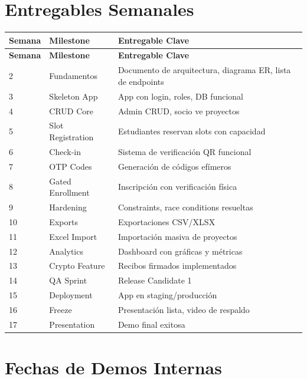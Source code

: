 \documentclass[12pt,a4paper]{article}
\begin{document}
\section{Entregables Semanales}

\begin{longtable}{@{}llp{8cm}@{}}
\toprule
\textbf{Semana} & \textbf{Milestone} & \textbf{Entregable Clave} \\
\midrule
\endfirsthead
\toprule
\textbf{Semana} & \textbf{Milestone} & \textbf{Entregable Clave} \\
\midrule
\endhead
2 & Fundamentos & Documento de arquitectura, diagrama ER, lista de endpoints \\
3 & Skeleton App & App con login, roles, DB funcional \\
4 & CRUD Core & Admin CRUD, socio ve proyectos \\
5 & Slot Registration & Estudiantes reservan slots con capacidad \\
6 & Check-in & Sistema de verificación QR funcional \\
7 & OTP Codes & Generación de códigos efímeros \\
8 & Gated Enrollment & Inscripción con verificación física \\
9 & Hardening & Constraints, race conditions resueltas \\
10 & Exports & Exportaciones CSV/XLSX \\
11 & Excel Import & Importación masiva de proyectos \\
12 & Analytics & Dashboard con gráficas y métricas \\
13 & Crypto Feature & Recibos firmados implementados \\
14 & QA Sprint & Release Candidate 1 \\
15 & Deployment & App en staging/producción \\
16 & Freeze & Presentación lista, video de respaldo \\
17 & Presentation & Demo final exitosa \\
\bottomrule
\end{longtable}

\section{Fechas de Demos Internas}
\end{document}
